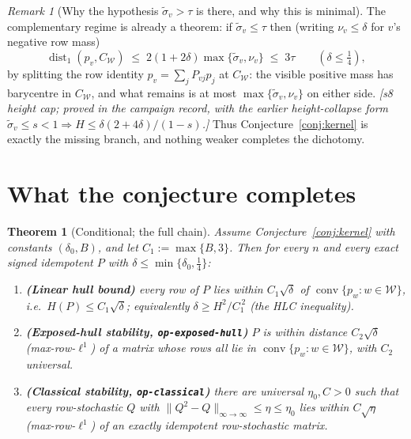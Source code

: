 \documentclass[11pt]{article}
\theoremstyle{plain}
\newtheorem{theorem}{Theorem}
\theoremstyle{definition}
\theoremstyle{remark}
\newtheorem{remark}{Remark}
\newcommand{\dist}{\operatorname{dist}_1}
\newcommand{\conv}{\operatorname{conv}}
\newcommand{\W}{\mathcal W}
\newcommand{\sigt}{\widetilde{\sigma}}
\begin{document}
\begin{remark}[Why the hypothesis $\sigt_v>\tau$ is there, and why this is minimal]
The complementary regime is already a theorem: if $\sigt_v\le\tau$ then (writing
$\nu_v\le\delta$ for $v$'s negative row mass)
\[
\dist(p_v,C_\W)\;\le\;2(1+2\delta)\max\{\sigt_v,\nu_v\}\;\le\;3\tau
\qquad(\delta\le\tfrac14),
\]
by splitting the row identity $p_v=\sum_j P_{vj}p_j$ at $C_\W$: the visible positive mass
has barycentre in $C_\W$, and what remains is at most $\max\{\sigt_v,\nu_v\}$ on either
side. \emph{[s8 height cap; proved in the campaign record, with the earlier
height-collapse form $\sigt_v\le s<1 \Rightarrow H\le \delta(2+4\delta)/(1-s)$.]}
Thus Conjecture~\ref{conj:kernel} is exactly the missing branch, and nothing weaker
completes the dichotomy.
\end{remark}

\section{What the conjecture completes}\label{sec:chain}

\begin{theorem}[Conditional; the full chain]\label{thm:chain}
Assume Conjecture~\ref{conj:kernel} with constants $(\delta_0,B)$, and let
$C_1:=\max\{B,3\}$. Then for every $n$ and every exact signed idempotent $P$ with
$\delta\le\min\{\delta_0,\tfrac14\}$:
\begin{enumerate}
\item[\textup{(a)}] \textbf{(Linear hull bound)} every row of $P$ lies within
$C_1\sqrt{\delta}$ of $\conv\{p_w:w\in\W\}$, i.e.\ $H(P)\le C_1\sqrt\delta$; equivalently
$\delta\ge H^2/C_1^{\,2}$ \textup{(the HLC inequality)}.
\item[\textup{(b)}] \textbf{(Exposed-hull stability, \texttt{op-exposed-hull})} $P$ is
within distance $C_2\sqrt{\delta}$ (max-row-$\ell^1$) of a matrix whose rows all lie in
$\conv\{p_w:w\in\W\}$, with $C_2$ universal.
\item[\textup{(c)}] \textbf{(Classical stability, \texttt{op-classical})} there are
universal $\eta_0,C>0$ such that every row-stochastic $Q$ with
$\|Q^2-Q\|_{\infty\to\infty}\le\eta\le\eta_0$ lies within $C\sqrt{\eta}$
(max-row-$\ell^1$) of an exactly idempotent row-stochastic matrix.
\end{enumerate}
\end{theorem}
\end{document}
